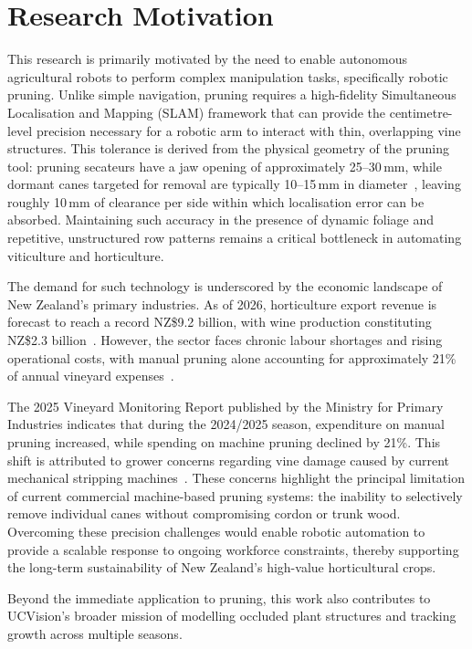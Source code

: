 \section{Research Motivation}
\label{sec:motivation}

This research is primarily motivated by the need to enable autonomous agricultural robots to perform complex manipulation tasks, specifically robotic pruning. Unlike simple navigation, pruning requires a high-fidelity Simultaneous Localisation and Mapping (SLAM) framework that can provide the centimetre-level precision necessary for a robotic arm to interact with thin, overlapping vine structures. This tolerance is derived from the physical geometry of the pruning tool: pruning secateurs have a jaw opening of approximately 25--30\,mm, while dormant canes targeted for removal are typically 10--15\,mm in diameter~\cite{pennstateextensionDormantCaneSpur2023}, leaving roughly 10\,mm of clearance per side within which localisation error can be absorbed. Maintaining such accuracy in the presence of dynamic foliage and repetitive, unstructured row patterns remains a critical bottleneck in automating viticulture and horticulture.

The demand for such technology is underscored by the economic landscape of New Zealand's primary industries. As of 2026, horticulture export revenue is forecast to reach a record NZ\$9.2 billion, with wine production constituting NZ\$2.3 billion~\cite{industriesSituationOutlookPrimary2025}. However, the sector faces chronic labour shortages and rising operational costs, with manual pruning alone accounting for approximately 21\% of annual vineyard expenses~\cite{industriesMarlboroughVineyardMonitoring2025}.

The 2025 Vineyard Monitoring Report published by the Ministry for Primary Industries indicates that during the 2024/2025 season, expenditure on manual pruning increased, while spending on machine pruning declined by 21\%. This shift is attributed to grower concerns regarding vine damage caused by current mechanical stripping machines~\cite{industriesMarlboroughVineyardMonitoring2025}. These concerns highlight the principal limitation of current commercial machine-based pruning systems: the inability to selectively remove individual canes without compromising cordon or trunk wood. Overcoming these precision challenges would enable robotic automation to provide a scalable response to ongoing workforce constraints, thereby supporting the long-term sustainability of New Zealand’s high-value horticultural crops.

Beyond the immediate application to pruning, this work also contributes to UCVision's broader mission of modelling occluded plant structures and tracking growth across multiple seasons.




